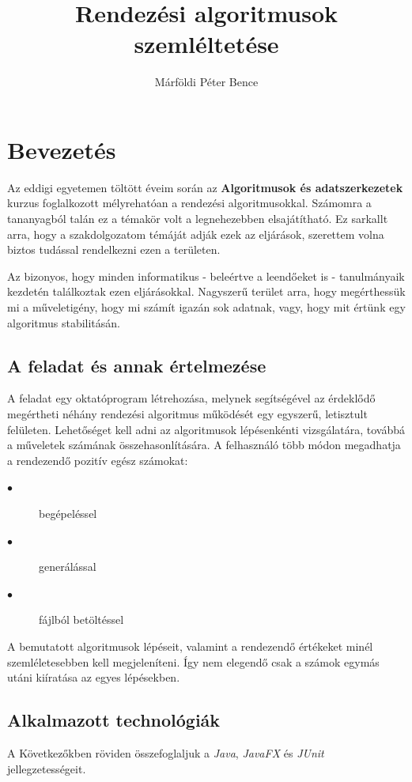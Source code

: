 \documentclass{elteikthesis}
\title{Rendezési algoritmusok szemléltetése}
\author{Márföldi Péter Bence}
\begin{document}
\frontmatter

	\maketitle
	\renewcommand{\thepage}{}
	\tableofcontents
	
\mainmatter
	\pagestyle{fancy}

\chapter{Bevezetés} 
 Az eddigi egyetemen töltött éveim során az \textbf{Algoritmusok és adatszerkezetek} kurzus foglalkozott mélyrehatóan a rendezési algoritmusokkal. Számomra a tananyagból talán ez a témakör volt a legnehezebben elsajátítható. Ez sarkallt arra, hogy a szakdolgozatom témáját adják ezek az eljárások, szerettem volna biztos tudással rendelkezni ezen a területen.\par
 Az bizonyos, hogy minden informatikus - beleértve a leendőeket is - tanulmányaik kezdetén találkoztak ezen eljárásokkal. Nagyszerű terület arra, hogy megérthessük mi a műveletigény, hogy mi számít igazán sok adatnak, vagy, hogy mit értünk egy algoritmus stabilitásán.\par

\section{A feladat és annak értelmezése}
A feladat egy oktatóprogram létrehozása, melynek segítségével az érdeklődő megértheti néhány rendezési algoritmus működését egy egyszerű, letisztult felületen. Lehetőséget kell adni az algoritmusok lépésenkénti vizsgálatára, továbbá a műveletek számának összehasonlítására. A felhasználó több módon megadhatja a rendezendő pozitív egész számokat:
\begin{description}
	\item[$\bullet$] begépeléssel
	\item[$\bullet$] generálással
	\item[$\bullet$] fájlból betöltéssel
\end{description}\par
A bemutatott algoritmusok lépéseit, valamint a rendezendő értékeket minél szemléletesebben kell megjeleníteni. Így nem elegendő csak a számok egymás utáni kiíratása az egyes lépésekben.

\section{Alkalmazott technológiák}
A Következőkben röviden összefoglaljuk a \emph{Java}\cite{Java}, \emph{JavaFX}\cite{JavaFX} és \emph{JUnit}\cite{JUnit} jellegzetességeit.
\end{document}

